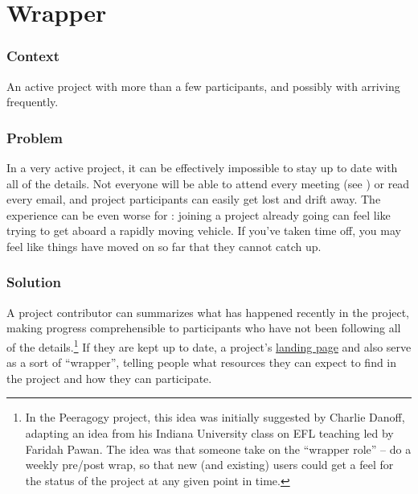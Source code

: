 \begingroup \color{BurntOrange}
\section{Wrapper}\label{sec:Wrapper}

\subsubsection*{Context} An active project with more than a few participants, and possibly with  arriving frequently.  

\subsubsection*{Problem} In a very active project, it can be effectively impossible to stay up to date with all of the details.  Not everyone will be able to attend every meeting (see ) or read every email, and project participants can easily get lost and drift away.  The experience can be even worse for : joining a project already going can feel like trying to get aboard a rapidly moving vehicle.  If you've taken time off, you may feel like things have moved on so far that they cannot catch up. 

\subsubsection*{Solution}
A project contributor can summarizes what has happened recently in the project, making progress comprehensible to participants who have not been following all of the details.\footnote{In the Peeragogy project, this idea was initially suggested by Charlie Danoff, adapting an idea from his Indiana University class on EFL teaching led by Faridah Pawan. The idea was that someone take on the ``wrapper role'' -- do a weekly pre/post wrap, so that new (and existing) users could get a feel for the status of the project at any given point in time.}  If they are kept up to date, a project's \href{http://socialmediaclassroom.com/host/peeragogy/}{landing page} and  also serve as a sort of ``wrapper'', telling people what resources they can expect to find in the project and how they can participate.  

